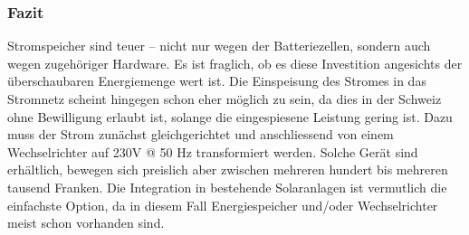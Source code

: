 \subsubsection{Fazit}
Stromspeicher sind teuer – nicht nur wegen der Batteriezellen, sondern auch wegen zugehöriger Hardware. Es ist fraglich, ob es diese Investition angesichts der überschaubaren Energiemenge wert ist. 
Die Einspeisung des Stromes in das Stromnetz scheint hingegen schon eher möglich zu sein, da dies in der Schweiz ohne Bewilligung erlaubt ist, solange die eingespiesene Leistung gering ist. Dazu muss der Strom zunächst gleichgerichtet und anschliessend von einem Wechselrichter auf 230\si{V} @ 50 \si{Hz} transformiert werden. Solche Gerät sind erhältlich, bewegen sich preislich aber zwischen mehreren hundert bis mehreren tausend Franken.
Die Integration in bestehende Solaranlagen ist vermutlich die einfachste Option, da in diesem Fall Energiespeicher und/oder Wechselrichter meist schon vorhanden sind.


\clearpage 





